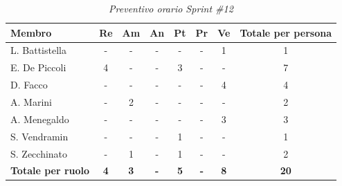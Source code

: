 ﻿\documentclass[a4paper, 10pt, colorlinks=true, linkcolor=black, urlcolor=blue, citecolor=blue, hidelinks]{article}
\renewcommand{\arraystretch}{1.2}
\begin{document}
\begin{table}[H]
    \centering
    \renewcommand{\arraystretch}{1.4}
    \begin{tabular}{|l|c|c|c|c|c|c|c|}
        \hline
        \rowcolor{bluBitless!15}
        \textbf{Membro} & \textbf{Re} & \textbf{Am} & \textbf{An} & \textbf{Pt} & \textbf{Pr} & \textbf{Ve} & \textbf{Totale per persona} \\
        \hline
        L. Battistella & - & - & - & - & - & 1 & 1 \\ \hline
        E. De Piccoli & 4 & - & - & 3 & - & - & 7 \\ \hline
        D. Facco & - & - & - & - & - & 4 & 4 \\ \hline
        A. Marini & - & 2 & - & - & - & - & 2 \\ \hline
        A. Menegaldo & - & - & - & - & - & 3 & 3 \\ \hline
        S. Vendramin & - & - & - & 1 & - & - & 1 \\ \hline
        S. Zecchinato & - & 1 & - & 1 & - & - & 2 \\ \hline
        \rowcolor{bluBitless!8}
        \textbf{Totale per ruolo} & \textbf{4} & \textbf{3} & \textbf{-} & \textbf{5} & \textbf{-} & \textbf{8} & \textbf{20} \\
        \hline
    \end{tabular}
    \caption{\textit{Preventivo orario Sprint \#12}}
\end{table}
\end{document}
